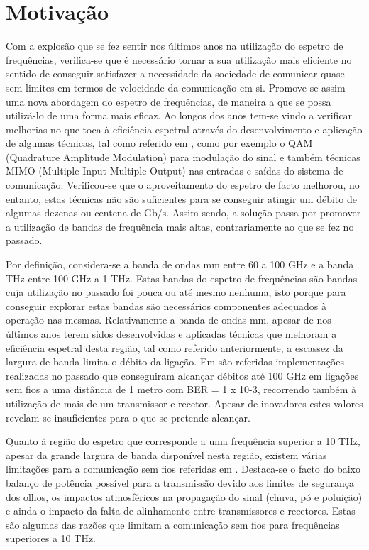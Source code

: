 \section{Motivação} \label{sec:goals}
Com a explosão que se fez sentir nos últimos anos na utilização do espetro de frequências, verifica-se que é necessário tornar a sua utilização mais eficiente no sentido de conseguir satisfazer a necessidade da sociedade de comunicar quase sem limites em termos de velocidade da comunicação em si. Promove-se assim uma nova abordagem do espetro de frequências, de maneira a que se possa utilizá-lo de uma forma mais eficaz.  
Ao longos dos anos tem-se vindo a verificar melhorias no que toca à eficiência espetral através do desenvolvimento e aplicação de algumas técnicas, tal como referido em \cite{R007}, como por exemplo o QAM (Quadrature Amplitude Modulation) para modulação do sinal e também técnicas MIMO (Multiple Input Multiple Output) nas entradas e saídas do sistema de comunicação. Verificou-se que o aproveitamento do espetro de facto melhorou, no entanto, estas técnicas não são suficientes para se conseguir atingir um débito de algumas dezenas ou centena de Gb/s. Assim sendo, a solução passa por promover a utilização de bandas de frequência mais altas, contrariamente ao que se fez no passado.  

Por definição, considera-se a banda de ondas mm entre 60 a 100 GHz e a banda THz entre 100 GHz a 1 THz. Estas bandas do espetro de frequências são bandas cuja utilização no passado foi pouca ou até mesmo nenhuma, isto porque para conseguir explorar estas bandas são necessários componentes adequados à operação nas mesmas. Relativamente a banda de ondas mm, apesar de nos últimos anos terem sidos desenvolvidas e aplicadas técnicas que melhoram a eficiência espetral desta região, tal como referido anteriormente, a escassez da largura de banda limita o débito da ligação. Em \cite{R007} são referidas implementações realizadas no passado que conseguiram alcançar débitos até 100 GHz em ligações sem fios a uma distância de 1 metro com BER = 1 x 10-3, recorrendo também à utilização de mais de um transmissor e recetor. Apesar de inovadores estes valores revelam-se insuficientes para o que se pretende alcançar. 

Quanto à região do espetro que corresponde a uma frequência superior a 10 THz, apesar da grande largura de banda disponível nesta região, existem várias limitações para a comunicação sem fios referidas em \cite{R005}. Destaca-se o facto do baixo balanço de potência possível para a transmissão devido aos limites de segurança dos olhos, os impactos atmosféricos na propagação do sinal (chuva, pó e poluição) e ainda o impacto da falta de alinhamento entre transmissores e recetores. Estas são algumas das razões que limitam a comunicação sem fios para frequências superiores a 10 THz.

